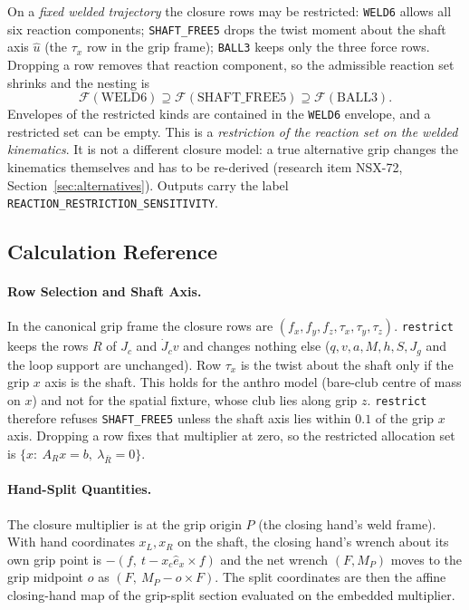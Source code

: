 \documentclass[11pt,a4paper]{article}
\begin{document}
On a \emph{fixed welded trajectory} the closure rows may be restricted:
\texttt{WELD6} allows all six reaction components; \texttt{SHAFT\_FREE5} drops
the twist moment about the shaft axis $\hat u$ (the $\tau_x$ row in the grip
frame); \texttt{BALL3} keeps only the three force rows.  Dropping a row removes
that reaction component, so the admissible reaction set shrinks and the nesting
is
\begin{equation}
\mathcal F(\text{WELD6})\supseteq\mathcal F(\text{SHAFT\_FREE5})\supseteq
\mathcal F(\text{BALL3}).
\end{equation}
Envelopes of the restricted kinds are contained in the \texttt{WELD6}
envelope, and a restricted set can be empty.  This is a \emph{restriction of
the reaction set on the welded kinematics}.  It is not a different closure
model: a true alternative grip changes the kinematics themselves and has to be
re-derived (research item NSX-72, Section~\ref{sec:alternatives}).  Outputs carry the label
\texttt{REACTION\_RESTRICTION\_SENSITIVITY}.

\subsection{Calculation Reference}
\paragraph{Row Selection and Shaft Axis.}
In the canonical grip frame the closure rows are $(f_x,f_y,f_z,\tau_x,\tau_y,
\tau_z)$.  \texttt{restrict} keeps the rows $R$ of $J_c$ and $\dot J_c v$ and
changes nothing else ($q,v,a,M,h,S,J_g$ and the loop support are unchanged).
Row $\tau_x$ is the twist about the shaft only if the grip $x$ axis is the
shaft.  This holds for the anthro model (bare-club centre of mass on $x$) and
not for the spatial fixture, whose club lies along grip $z$.  \texttt{restrict}
therefore refuses \texttt{SHAFT\_FREE5} unless the shaft axis lies within
$0.1$ of the grip $x$ axis.  Dropping a row fixes that multiplier at zero, so
the restricted allocation set is $\{x:\ A_R x=b,\ \lambda_{\bar R}=0\}$.

\paragraph{Hand-Split Quantities.}
The closure multiplier is at the grip origin $P$ (the closing hand's weld
frame).  With hand coordinates $x_L,x_R$ on the shaft, the closing hand's
wrench about its own grip point is $-(f,\ t-x_c\hat e_x\times f)$ and the net
wrench $(F,M_P)$ moves to the grip midpoint $o$ as $(F,\ M_P-o\times F)$.  The
split coordinates are then the affine closing-hand map of the grip-split
section evaluated on the embedded multiplier.
\end{document}
